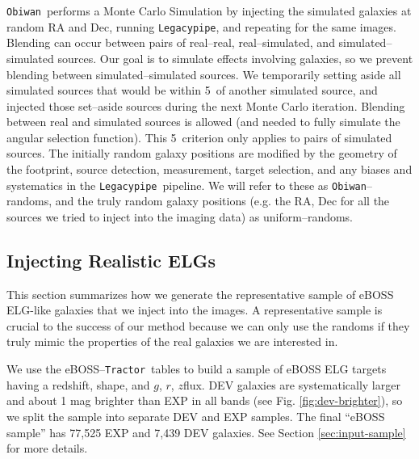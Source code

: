 \documentclass[a4paper,fleqn,usenatbib]{mnras}
\newcommand{\gb}{$g$}
\newcommand{\rband}{$r$}
\newcommand{\zb}{$z$}
\newcommand{\tractor}{{\tt Tractor}}
\newcommand{\legacypipe}{{\tt Legacypipe}}
\newcommand{\obiwan}{{\tt Obiwan}}
\begin{document}
\obiwan\, performs a Monte Carlo Simulation by injecting the simulated galaxies at random RA and Dec, running \legacypipe, and repeating for the same images. Blending can occur between pairs of real--real, real--simulated, and simulated--simulated sources. Our goal is to simulate effects involving galaxies, so we prevent blending between simulated--simulated sources. We temporarily setting aside all simulated sources that would be within 5\arcsec\, of another simulated source, and injected those set--aside sources during the next Monte Carlo iteration. Blending between real and simulated sources is allowed (and needed to fully simulate the angular selection function). This 5\arcsec\, criterion only applies to pairs of simulated sources. The initially random galaxy positions are modified by the geometry of the footprint, source detection, measurement, target selection, and any biases and systematics in the \legacypipe\, pipeline. We will refer to these as \obiwan--randoms, and the truly random galaxy positions (e.g. the RA, Dec for all the sources we tried to inject into the imaging data) as uniform--randoms.

\subsection{Injecting Realistic ELGs}
\label{sec:injecting-elgs}

This section summarizes how we generate the representative sample of eBOSS ELG-like galaxies that we inject into the images. A representative sample is crucial to the success of our method because we can only use the randoms if they truly mimic the properties of the real galaxies we are interested in. 

We use the eBOSS--\tractor\, tables to build a sample of eBOSS ELG targets having a redshift, shape, and \gb, \rband, \zb flux. DEV galaxies are systematically larger and about 1 mag brighter than EXP in all bands (see Fig. \ref{fig:dev-brighter}), so we split the sample into separate DEV and EXP samples. The final ``eBOSS sample'' has 77,525 EXP and 7,439 DEV galaxies. See Section \ref{sec:input-sample} for more details.
\end{document}
